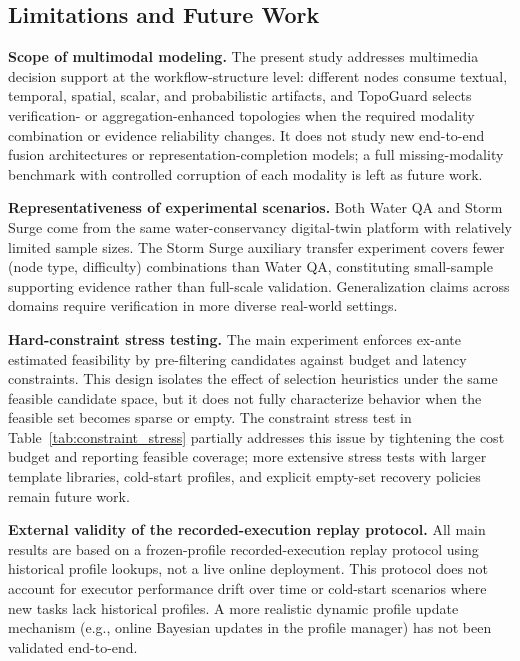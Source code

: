 \documentclass[acmsmall,review,anonymous]{acmart}
\begin{document}
\subsection{Limitations and Future Work}
\label{subsec:limitations}

\textbf{Scope of multimodal modeling.} The present study addresses multimedia decision support at the workflow-structure level: different nodes consume textual, temporal, spatial, scalar, and probabilistic artifacts, and TopoGuard selects verification- or aggregation-enhanced topologies when the required modality combination or evidence reliability changes. It does not study new end-to-end fusion architectures or representation-completion models; a full missing-modality benchmark with controlled corruption of each modality is left as future work.

\textbf{Representativeness of experimental scenarios.} Both Water QA and Storm Surge come from the same water-conservancy digital-twin platform with relatively limited sample sizes. The Storm Surge auxiliary transfer experiment covers fewer (node type, difficulty) combinations than Water QA, constituting small-sample supporting evidence rather than full-scale validation. Generalization claims across domains require verification in more diverse real-world settings.

\textbf{Hard-constraint stress testing.} The main experiment enforces ex-ante estimated feasibility by pre-filtering candidates against budget and latency constraints. This design isolates the effect of selection heuristics under the same feasible candidate space, but it does not fully characterize behavior when the feasible set becomes sparse or empty. The constraint stress test in Table~\ref{tab:constraint_stress} partially addresses this issue by tightening the cost budget and reporting feasible coverage; more extensive stress tests with larger template libraries, cold-start profiles, and explicit empty-set recovery policies remain future work.

\textbf{External validity of the recorded-execution replay protocol.} All main results are based on a frozen-profile recorded-execution replay protocol using historical profile lookups, not a live online deployment. This protocol does not account for executor performance drift over time or cold-start scenarios where new tasks lack historical profiles. A more realistic dynamic profile update mechanism (e.g., online Bayesian updates in the profile manager) has not been validated end-to-end.
\end{document}
